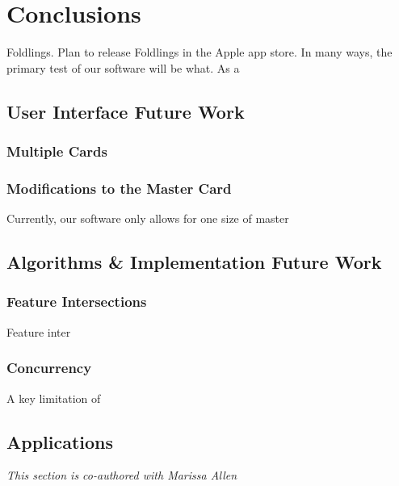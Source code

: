 \chapter{Conclusions}

Foldlings. Plan to release Foldlings in the Apple app store. In many
ways, the primary test of our software will be what. As a

\section{User Interface Future Work}\label{user-interface-future-work}

\subsection{Multiple Cards}\label{multiple-cards}

\citet{hart2007modular}

\subsection{Modifications to the Master
Card}\label{modifications-to-the-master-card}

Currently, our software only allows for one size of master

\section{Algorithms \& Implementation Future
Work}\label{algorithms-implementation-future-work}

\subsection{Feature Intersections}\label{feature-intersections}

Feature inter

\subsection{Concurrency}\label{concurrency}

A key limitation of

\section{Applications}\label{applications}

\emph{This section is co-authored with Marissa Allen}
